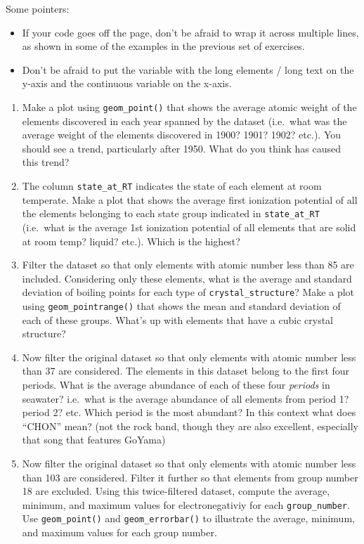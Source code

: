 \documentclass[
]{krantz}
\begin{document}
Some pointers:

\begin{itemize}
\item
  If your code goes off the page, don't be afraid to wrap it across multiple lines, as shown in some of the examples in the previous set of exercises.
\item
  Don't be afraid to put the variable with the long elements / long text on the y-axis and the continuous variable on the x-axis.
\end{itemize}

\begin{enumerate}
\def\labelenumi{\arabic{enumi}.}
\item
  Make a plot using \texttt{geom\_point()} that shows the average atomic weight of the elements discovered in each year spanned by the dataset (i.e.~what was the average weight of the elements discovered in 1900? 1901? 1902? etc.). You should see a trend, particularly after 1950. What do you think has caused this trend?
\item
  The column \texttt{state\_at\_RT} indicates the state of each element at room temperate. Make a plot that shows the average first ionization potential of all the elements belonging to each state group indicated in \texttt{state\_at\_RT} (i.e.~what is the average 1st ionization potential of all elements that are solid at room temp? liquid? etc.). Which is the highest?
\item
  Filter the dataset so that only elements with atomic number less than 85 are included. Considering only these elements, what is the average and standard deviation of boiling points for each type of \texttt{crystal\_structure}? Make a plot using \texttt{geom\_pointrange()} that shows the mean and standard deviation of each of these groups. What's up with elements that have a cubic crystal structure?
\item
  Now filter the original dataset so that only elements with atomic number less than 37 are considered. The elements in this dataset belong to the first four periods. What is the average abundance of each of these four \emph{periods} in seawater? i.e.~what is the average abundance of all elements from period 1? period 2? etc. Which period is the most abundant? In this context what does ``CHON'' mean? (not the rock band, though they are also excellent, especially that song that features GoYama)
\item
  Now filter the original dataset so that only elements with atomic number less than 103 are considered. Filter it further so that elements from group number 18 are excluded. Using this twice-filtered dataset, compute the average, minimum, and maximum values for electronegativiy for each \texttt{group\_number}. Use \texttt{geom\_point()} and \texttt{geom\_errorbar()} to illustrate the average, minimum, and maximum values for each group number.

\end{enumerate}
\end{document}
